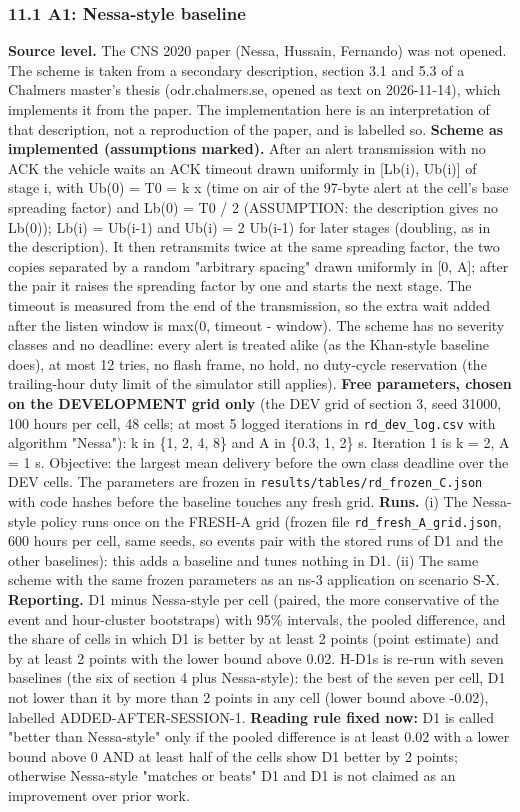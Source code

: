 \subsubsection*{11.1 A1: Nessa-style baseline}
\textbf{Source level.} The CNS 2020 paper (Nessa, Hussain, Fernando) was not opened. The scheme is taken from a secondary description, section 3.1 and 5.3 of a Chalmers master's thesis (odr.chalmers.se, opened as text on 2026-11-14), which implements it from the paper. The implementation here is an interpretation of that description, not a reproduction of the paper, and is labelled so.
\textbf{Scheme as implemented (assumptions marked).} After an alert transmission with no ACK the vehicle waits an ACK timeout drawn uniformly in [Lb(i), Ub(i)] of stage i, with Ub(0) = T0 = k x (time on air of the 97-byte alert at the cell's base spreading factor) and Lb(0) = T0 / 2 (ASSUMPTION: the description gives no Lb(0)); Lb(i) = Ub(i-1) and Ub(i) = 2 Ub(i-1) for later stages (doubling, as in the description). It then retransmits twice at the same spreading factor, the two copies separated by a random "arbitrary spacing" drawn uniformly in [0, A]; after the pair it raises the spreading factor by one and starts the next stage. The timeout is measured from the end of the transmission, so the extra wait added after the listen window is max(0, timeout - window). The scheme has no severity classes and no deadline: every alert is treated alike (as the Khan-style baseline does), at most 12 tries, no flash frame, no hold, no duty-cycle reservation (the trailing-hour duty limit of the simulator still applies).
\textbf{Free parameters, chosen on the DEVELOPMENT grid only} (the DEV grid of section 3, seed 31000, 100 hours per cell, 48 cells; at most 5 logged iterations in \texttt{rd\_dev\_log.csv} with algorithm "Nessa"): k in \{1, 2, 4, 8\} and A in \{0.3, 1, 2\} s. Iteration 1 is k = 2, A = 1 s. Objective: the largest mean delivery before the own class deadline over the DEV cells. The parameters are frozen in \texttt{results/tables/rd\_frozen\_C.json} with code hashes before the baseline touches any fresh grid.
\textbf{Runs.} (i) The Nessa-style policy runs once on the FRESH-A grid (frozen file \texttt{rd\_fresh\_A\_grid.json}, 600 hours per cell, same seeds, so events pair with the stored runs of D1 and the other baselines): this adds a baseline and tunes nothing in D1. (ii) The same scheme with the same frozen parameters as an ns-3 application on scenario S-X.
\textbf{Reporting.} D1 minus Nessa-style per cell (paired, the more conservative of the event and hour-cluster bootstraps) with 95\% intervals, the pooled difference, and the share of cells in which D1 is better by at least 2 points (point estimate) and by at least 2 points with the lower bound above 0.02. H-D1s is re-run with seven baselines (the six of section 4 plus Nessa-style): the best of the seven per cell, D1 not lower than it by more than 2 points in any cell (lower bound above -0.02), labelled ADDED-AFTER-SESSION-1. \textbf{Reading rule fixed now:} D1 is called "better than Nessa-style" only if the pooled difference is at least 0.02 with a lower bound above 0 AND at least half of the cells show D1 better by 2 points; otherwise Nessa-style "matches or beats" D1 and D1 is not claimed as an improvement over prior work.

